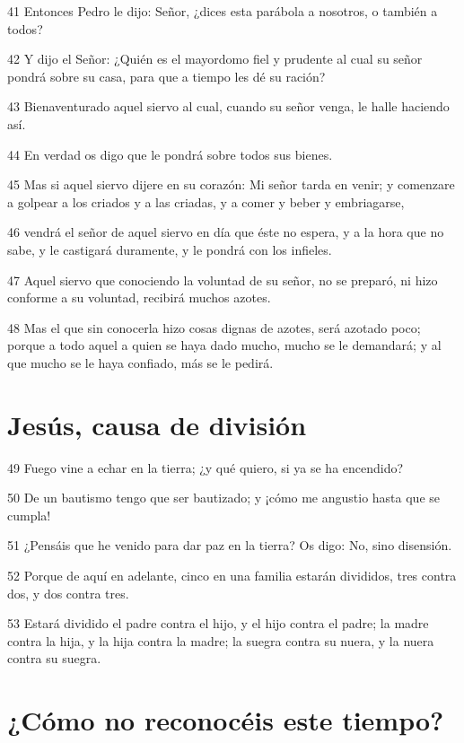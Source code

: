 \par 41 Entonces Pedro le dijo: Señor, ¿dices esta parábola a nosotros, o también a todos?
\par 42 Y dijo el Señor: ¿Quién es el mayordomo fiel y prudente al cual su señor pondrá sobre su casa, para que a tiempo les dé su ración?
\par 43 Bienaventurado aquel siervo al cual, cuando su señor venga, le halle haciendo así.
\par 44 En verdad os digo que le pondrá sobre todos sus bienes.
\par 45 Mas si aquel siervo dijere en su corazón: Mi señor tarda en venir; y comenzare a golpear a los criados y a las criadas, y a comer y beber y embriagarse,
\par 46 vendrá el señor de aquel siervo en día que éste no espera, y a la hora que no sabe, y le castigará duramente, y le pondrá con los infieles.
\par 47 Aquel siervo que conociendo la voluntad de su señor, no se preparó, ni hizo conforme a su voluntad, recibirá muchos azotes.
\par 48 Mas el que sin conocerla hizo cosas dignas de azotes, será azotado poco; porque a todo aquel a quien se haya dado mucho, mucho se le demandará; y al que mucho se le haya confiado, más se le pedirá.

\section*{Jesús, causa de división}

\par 49 Fuego vine a echar en la tierra; ¿y qué quiero, si ya se ha encendido?
\par 50 De un bautismo tengo que ser bautizado; y ¡cómo me angustio hasta que se cumpla!
\par 51 ¿Pensáis que he venido para dar paz en la tierra? Os digo: No, sino disensión.
\par 52 Porque de aquí en adelante, cinco en una familia estarán divididos, tres contra dos, y dos contra tres.
\par 53 Estará dividido el padre contra el hijo, y el hijo contra el padre; la madre contra la hija, y la hija contra la madre; la suegra contra su nuera, y la nuera contra su suegra.

\section*{¿Cómo no reconocéis este tiempo?}

